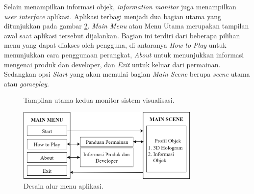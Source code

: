 		Selain menampilkan informasi objek, \textit{information monitor} juga menampilkan \textit{user interface} aplikasi. Aplikasi terbagi menjadi dua bagian utama yang ditunjukkan pada gambar \ref{fig:storyboard}. \textit{Main Menu} atau Menu Utama merupakan tampilan awal saat aplikasi tersebut dijalankan. Bagian ini terdiri dari beberapa pilihan menu yang dapat diakses oleh pengguna, di antaranya \textit{How to Play} untuk menunjukkan cara penggunaan perangkat, \textit{About} untuk menunjukkan informasi mengenai produk dan developer, dan \textit{Exit} untuk keluar dari permainan. Sedangkan opsi \textit{Start} yang akan memulai bagian \textit{Main Scene} berupa \textit{scene} utama atau \textit{gameplay}.
		\vspace{-2ex}
		\begin{figure} [H]
			\hspace{0.1em}
			\caption{Tampilan utama kedua monitor sistem visualisasi.}
			\label{fig:desain_monitor}
		\end{figure}
		\vspace{-2ex}
		\begin{figure}[H]
			\includegraphics[width=0.8\textwidth]{img/bab3/storyboard.png}
			\caption{Desain alur menu aplikasi.}
			\label{fig:storyboard}
		\end{figure}
